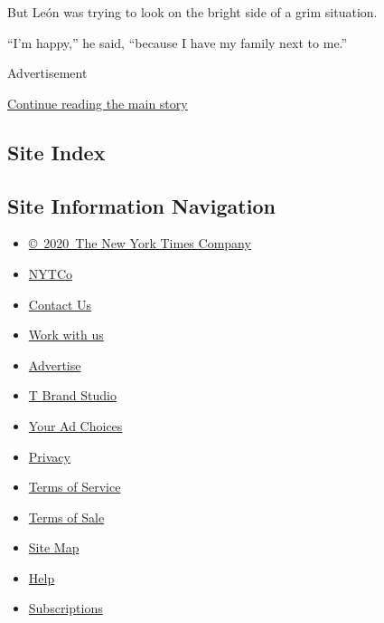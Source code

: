 But León was trying to look on the bright side of a grim situation.

``I'm happy,'' he said, ``because I have my family next to me.''

Advertisement

\protect\hyperlink{after-bottom}{Continue reading the main story}

\hypertarget{site-index}{%
\subsection{Site Index}\label{site-index}}

\hypertarget{site-information-navigation}{%
\subsection{Site Information
Navigation}\label{site-information-navigation}}

\begin{itemize}
\tightlist
\item
  \href{https://help.nytimes3xbfgragh.onion/hc/en-us/articles/115014792127-Copyright-notice}{©~2020~The
  New York Times Company}
\end{itemize}

\begin{itemize}
\tightlist
\item
  \href{https://www.nytco.com/}{NYTCo}
\item
  \href{https://help.nytimes3xbfgragh.onion/hc/en-us/articles/115015385887-Contact-Us}{Contact
  Us}
\item
  \href{https://www.nytco.com/careers/}{Work with us}
\item
  \href{https://nytmediakit.com/}{Advertise}
\item
  \href{http://www.tbrandstudio.com/}{T Brand Studio}
\item
  \href{https://www.nytimes3xbfgragh.onion/privacy/cookie-policy\#how-do-i-manage-trackers}{Your
  Ad Choices}
\item
  \href{https://www.nytimes3xbfgragh.onion/privacy}{Privacy}
\item
  \href{https://help.nytimes3xbfgragh.onion/hc/en-us/articles/115014893428-Terms-of-service}{Terms
  of Service}
\item
  \href{https://help.nytimes3xbfgragh.onion/hc/en-us/articles/115014893968-Terms-of-sale}{Terms
  of Sale}
\item
  \href{https://spiderbites.nytimes3xbfgragh.onion}{Site Map}
\item
  \href{https://help.nytimes3xbfgragh.onion/hc/en-us}{Help}
\item
  \href{https://www.nytimes3xbfgragh.onion/subscription?campaignId=37WXW}{Subscriptions}
\end{itemize}
